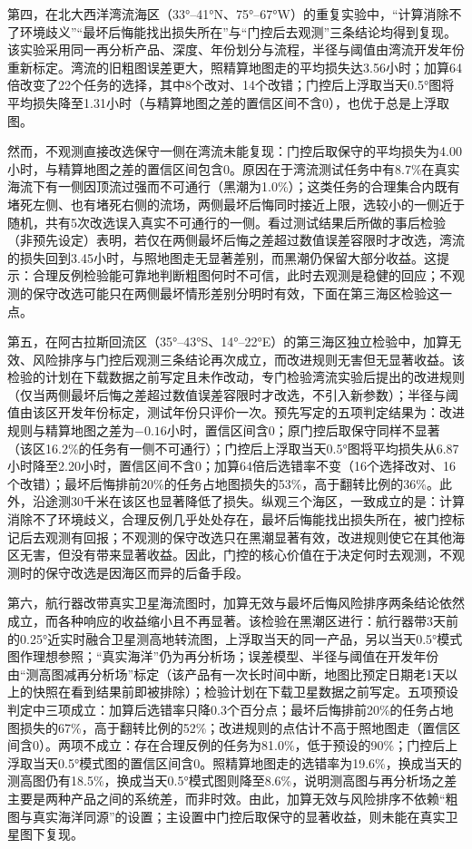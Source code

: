 第四，在北大西洋湾流海区（33°--41°N、75°--67°W）的重复实验中，“计算消除不了环境歧义”“最坏后悔能找出损失所在”与“门控后去观测”三条结论均得到复现。该实验采用同一再分析产品、深度、年份划分与流程，半径与阈值由湾流开发年份重新标定。湾流的旧粗图误差更大，照精算地图走的平均损失达3.56小时；加算64倍改变了22个任务的选择，其中8个改对、14个改错；门控后上浮取当天0.5°图将平均损失降至1.31小时（与精算地图之差的置信区间不含0），也优于总是上浮取图。

然而，不观测直接改选保守一侧在湾流未能复现：门控后取保守的平均损失为4.00小时，与精算地图之差的置信区间包含0。原因在于湾流测试任务中有8.7\%在真实海流下有一侧因顶流过强而不可通行（黑潮为1.0\%）；这类任务的合理集合内既有堵死左侧、也有堵死右侧的流场，两侧最坏后悔同时接近上限，选较小的一侧近于随机，共有5次改选误入真实不可通行的一侧。看过测试结果后所做的事后检验（非预先设定）表明，若仅在两侧最坏后悔之差超过数值误差容限时才改选，湾流的损失回到3.45小时，与照地图走无显著差别，而黑潮仍保留大部分收益。这提示：合理反例检验能可靠地判断粗图何时不可信，此时去观测是稳健的回应；不观测的保守改选可能只在两侧最坏情形差别分明时有效，下面在第三海区检验这一点。

第五，在阿古拉斯回流区（35°--43°S、14°--22°E）的第三海区独立检验中，加算无效、风险排序与门控后观测三条结论再次成立，而改进规则无害但无显著收益。该检验的计划在下载数据之前写定且未作改动，专门检验湾流实验后提出的改进规则（仅当两侧最坏后悔之差超过数值误差容限时才改选，不引入新参数）；半径与阈值由该区开发年份标定，测试年份只评价一次。预先写定的五项判定结果为：改进规则与精算地图之差为$-0.16$小时，置信区间含0；原门控后取保守同样不显著（该区16.2\%的任务有一侧不可通行）；门控后上浮取当天0.5°图将平均损失从6.87小时降至2.20小时，置信区间不含0；加算64倍后选错率不变（16个选择改对、16个改错）；最坏后悔排前20\%的任务占地图损失的53\%，高于翻转比例的36\%。此外，沿途测30千米在该区也显著降低了损失。纵观三个海区，一致成立的是：计算消除不了环境歧义，合理反例几乎处处存在，最坏后悔能找出损失所在，被门控标记后去观测有回报；不观测的保守改选只在黑潮显著有效，改进规则使它在其他海区无害，但没有带来显著收益。因此，门控的核心价值在于决定何时去观测，不观测时的保守改选是因海区而异的后备手段。

第六，航行器改带真实卫星海流图时，加算无效与最坏后悔风险排序两条结论依然成立，而各种响应的收益缩小且不再显著。该检验在黑潮区进行：航行器带3天前的0.25°近实时融合卫星测高地转流图，上浮取当天的同一产品，另以当天0.5°模式图作理想参照；“真实海洋”仍为再分析场；误差模型、半径与阈值在开发年份由“测高图减再分析场”标定（该产品有一次长时间中断，地图比预定日期老1天以上的快照在看到结果前即被排除）；检验计划在下载卫星数据之前写定。五项预设判定中三项成立：加算后选错率只降0.3个百分点；最坏后悔排前20\%的任务占地图损失的67\%，高于翻转比例的52\%；改进规则的点估计不高于照地图走（置信区间含0）。两项不成立：存在合理反例的任务为81.0\%，低于预设的90\%；门控后上浮取当天0.5°模式图的置信区间含0。照精算地图走的选错率为19.6\%，换成当天的测高图仍有18.5\%，换成当天0.5°模式图则降至8.6\%，说明测高图与再分析场之差主要是两种产品之间的系统差，而非时效。由此，加算无效与风险排序不依赖“粗图与真实海洋同源”的设置；主设置中门控后取保守的显著收益，则未能在真实卫星图下复现。

